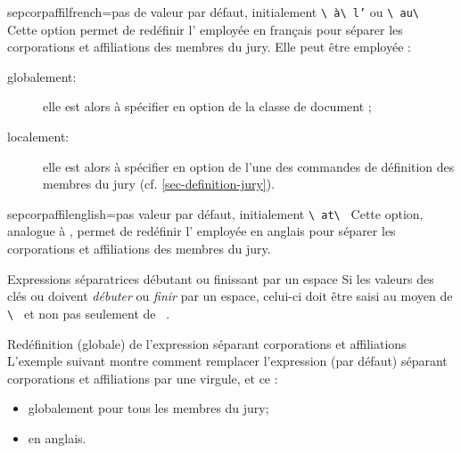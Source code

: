 \begin{docKey}{sepcorpaffilfrench}{=}{pas de valeur par défaut,
    initialement \lstinline[showspaces]+\ +\texttt{à}\lstinline[showspaces]+\ +\texttt{l'} ou
    \lstinline[showspaces]+\ au\ +}
  Cette option permet de redéfinir l' employée en français pour
  séparer les corporations et affiliations des membres du jury. Elle peut être
  employée :
  \begin{description}
  \item[globalement:] elle est alors à spécifier en option de la classe de
    document ;
  \item[localement:] elle est alors à spécifier en option de l'une des
    commandes de définition des membres du jury (cf.
    \vref{sec-definition-jury}).
  \end{description}
\end{docKey}

\begin{docKey}{sepcorpaffilenglish}{=}{pas valeur par
    défaut, initialement \lstinline[showspaces]+\ at\ +}
  Cette option, analogue à , permet de redéfinir
  l' employée en anglais pour séparer les corporations et
  affiliations des membres du jury.
\end{docKey}

\begin{dbwarning}{Expressions séparatrices débutant ou finissant par un espace}{}
  Si les valeurs des clés  ou
   doivent \emph{débuter} ou \emph{finir} par un
  espace, celui-ci doit être saisi au moyen de
  \lstinline[showspaces]+\ +
  et non pas seulement de
  \lstinline[showspaces]+ +.
\end{dbwarning}

\begin{dbexample}{Redéfinition (globale) de l'expression séparant corporations
    et affiliations}{}
  L'exemple suivant montre comment remplacer l'expression (par défaut) séparant
  corporations et affiliations par une virgule, et ce :
  \begin{itemize}
  \item globalement pour tous les membres du jury;
  \item en anglais.
  \end{itemize}
\end{dbexample}

